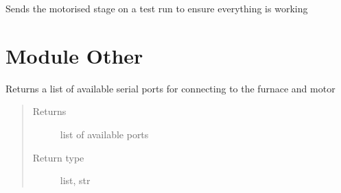 \documentclass[letterpaper,10pt,english]{sphinxmanual}
\begin{document}
\begin{fulllineitems}
\begin{fulllineitems}
\begin{quote}
\begin{description}
\end{description}\end{quote}

\end{fulllineitems}


\begin{fulllineitems}
\label{\detokenize{source/laboratory.drivers:laboratory.drivers.motor.Motor.test}}
Sends the motorised stage on a test run to ensure everything is working

\end{fulllineitems}


\end{fulllineitems}



\section{Module Other}
\label{\detokenize{source/laboratory.drivers:module-laboratory.drivers.other}}\label{\detokenize{source/laboratory.drivers:module-other}}

\begin{fulllineitems}
\label{\detokenize{source/laboratory.drivers:laboratory.drivers.other.get_ports}}
Returns a list of available serial ports for connecting to the furnace and motor
\begin{quote}\begin{description}
\item[{Returns}] \leavevmode
list of available ports

\item[{Return type}] \leavevmode
list, str

\end{description}\end{quote}

\end{fulllineitems}

\end{document}
